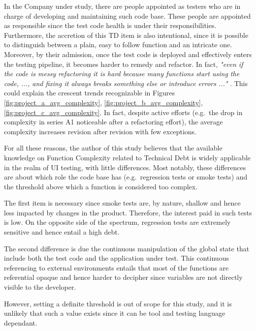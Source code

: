     In the Company under study, there are people appointed as testers who are in charge of developing and maintaining such code base. These people are appointed as responsible since the test code health is under their responsibilities. Furthermore, the accretion of this TD item is also intentional, since it is possible to distinguish between a plain, easy to follow function and an intricate one. Moreover, by their admission, once the test code is deployed and effectively enters the testing pipeline, it becomes harder to remedy and refactor. In fact, \textit{"even if the code is messy refactoring it is hard because many functions start using the code, ..., and fixing it always breaks something else or introduce errors ..." }. This could explain the crescent trends recognizable in Figures \ref{fig:project_a_avg_complexity}, \ref{fig:project_b_avg_complexity}, \ref{fig:project_c_avg_complexity}. In fact, despite active efforts (e.g.\ the drop in complexity in series A1 noticeable after a refactoring effort), the average complexity increases revision after revision with few exceptions.
    
    
    For all these reasons, the author of this study believes that the available knowledge on Function Complexity related to Technical Debt is widely applicable in the realm of UI testing, with little differences. Most notably, these differences are about which role the code base has (e.g.\ regression tests or smoke tests) and the threshold above which a function is considered too complex. 
    
    The first item is necessary since smoke tests are, by nature, shallow and hence less impacted by changes in the product. Therefore, the interest paid in such tests is low. On the opposite side of the spectrum, regression tests are extremely sensitive and hence entail a high debt.
    
    The second difference is due the continuous manipulation of the global state that include both the test code and the application under test. This continuous referencing to external environments entails that most of the functions are referential opaque \cite{referential_transparency} and hence harder to decipher since variables are not directly visible to the developer.
    
    However, setting a definite threshold is out of scope for this study, and it is unlikely that such a value exists since it can be tool and testing language dependant.
    

